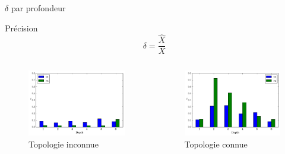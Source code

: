 \begin{frame}{$\delta$ par profondeur}
    \begin{block}{Précision}
      $$\delta = \frac{\widehat{X}}{X}$$
    \end{block}

    \begin{columns}
        \begin{column}{0.48\textwidth}
          \begin{figure}
            \centering
            \includegraphics[width=\textwidth]{figures/global_noinfo.pdf}
            \captionsetup{labelformat=empty}
            \caption{Topologie inconnue}
          \end{figure}
        \end{column}
        \begin{column}{0.50\textwidth}
          \begin{figure}
            \centering
            \includegraphics[width=\textwidth]{figures/global_route.pdf}
            \captionsetup{labelformat=empty}
            \caption{Topologie connue}
          \end{figure}


\end{column}
\end{columns}
\end{frame}
